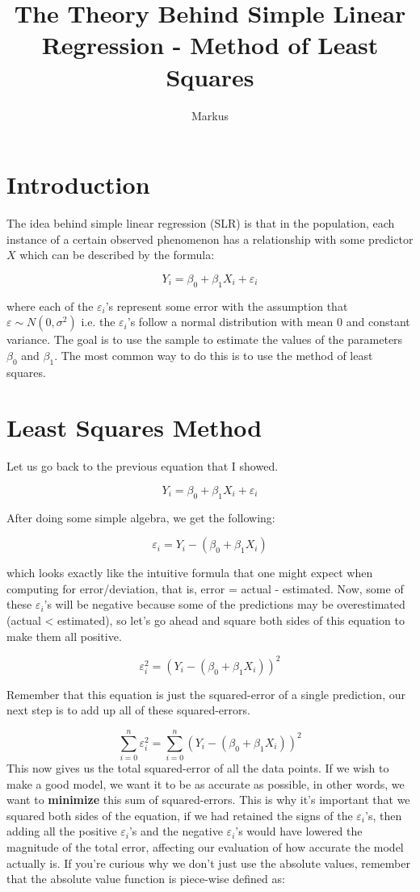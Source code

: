 \documentclass[12pt,a4paper]{article}
\title{The Theory Behind Simple Linear Regression - Method of Least Squares}
\author{Markus}
\date{}
\begin{document}
\maketitle

\section{Introduction}
The idea behind simple linear regression (SLR) is that in the population, each instance of a certain observed phenomenon has a relationship with some predictor $X$ which can be described by the formula:

$$Y_i = \beta_0 + \beta_1X_i + \varepsilon_i$$

where each of the $\varepsilon_i$'s represent some error with the assumption that $\varepsilon \sim N(0, \sigma^2)$ i.e. the $\varepsilon_i$'s follow a normal distribution with mean $0$ and constant variance. The goal is to use the sample to estimate the values of the parameters $\beta_0$ and $\beta_1$. The most common way to do this is to use the method of least squares.

\section{Least Squares Method}
Let us go back to the previous equation that I showed.

$$Y_i = \beta_0 + \beta_1X_i + \varepsilon_i$$

After doing some simple algebra, we get the following:

$$\varepsilon_i = Y_i - (\beta_0 + \beta_1X_i )$$

which looks exactly like the intuitive formula that one might expect when computing for error/deviation, that is, error = actual - estimated. Now, some of these $\varepsilon_i$'s will be negative because some of the predictions may be overestimated (actual < estimated), so let's go ahead and square both sides of this equation to make them all positive. 

$$\varepsilon_i^2 = (Y_i - (\beta_0 + \beta_1X_i ))^2$$

Remember that this equation is just the squared-error of a single prediction, our next step is to add up all of these squared-errors.

$$\sum_{i=0}^n\varepsilon_i^2 = \sum_{i=0}^n(Y_i - (\beta_0 + \beta_1X_i ))^2$$
This now gives us the total squared-error of all the data points. If we wish to make a good model, we want it to be as accurate as possible, in other words, we want to \textbf{minimize} this sum of squared-errors. This is why it's important that we squared both sides of the equation, if we had retained the signs of the $\varepsilon_i$'s, then adding all the positive $\varepsilon_i$'s and the negative $\varepsilon_i$'s would have lowered the magnitude of the total error, affecting our evaluation of how accurate the model actually is. If you're curious why we don't just use the absolute values, remember that the absolute value function is piece-wise defined as:
\end{document}
